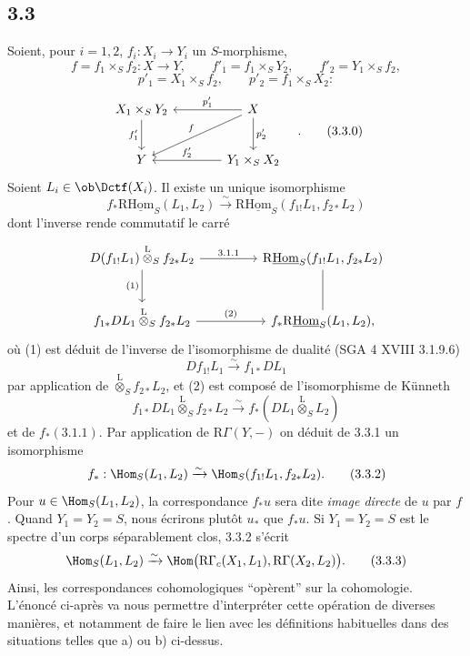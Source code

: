 \subsection*{3.3}
Soient, pour $i=1,2$, $f_i:X_i\to Y_i$ un $S$-morphisme,
\[
f=f_1\times_S f_2:X\to Y,
\qquad
f'_1=f_1\times_S Y_2,
\qquad
f'_2=Y_1\times_S f_2,
\]
\[
p'_1=X_1\times_S f_2,
\qquad
p'_2=f_1\times_S X_2:
\]
\begin{equation}
\begin{tikzcd}[column sep=3.8em,row sep=2.4em]
X_1\times_S Y_2 \arrow[d,"f'_1"'] & X \arrow[l,"p'_1"'] \arrow[dl,"f"'] \arrow[d,"p'_2"] \\
Y & Y_1\times_S X_2 \arrow[l,"f'_2"']
\end{tikzcd}\quad .
\tag{3.3.0}
\end{equation}
Soient $L_i\in\ob\Dctf(X_i)$. Il existe un unique isomorphisme
\begin{equation}
f_*\mathrm{R}\underline{\mathrm{Hom}}_S(L_1,L_2)
\xrightarrow{\sim}
\mathrm{R}\underline{\mathrm{Hom}}_S(f_{1!}L_1,f_{2*}L_2)
\tag{3.3.1}
\end{equation}
dont l'inverse rende commutatif le carré
\[
\begin{tikzcd}[column sep=4.5em,row sep=2.6em]
D(f_{1!}L_1)\overset{\mathrm{L}}{\otimes}_S f_{2*}L_2
  \arrow[r,"3.1.1"] \arrow[d,"(1)"']
& \mathrm{R}\underline{\mathrm{Hom}}_S(f_{1!}L_1,f_{2*}L_2) \arrow[d,dash] \\
f_{1*}DL_1\overset{\mathrm{L}}{\otimes}_S f_{2*}L_2
  \arrow[r,"(2)"]
& f_*\mathrm{R}\underline{\mathrm{Hom}}_S(L_1,L_2),
\end{tikzcd}
\]
où (1) est
déduit de l'inverse de l'isomorphisme de dualité (SGA 4 XVIII 3.1.9.6)
\[
Df_{1!}L_1\xrightarrow{\sim}f_{1*}DL_1
\]
par application de $\overset{\mathrm{L}}{\otimes}_S f_{2*}L_2$, et (2) est composé de l'isomorphisme de Künneth
\[
f_{1*}DL_1\overset{\mathrm{L}}{\otimes}_S f_{2*}L_2
\xrightarrow{\sim}
f_*(DL_1\overset{\mathrm{L}}{\otimes}_S L_2)
\]
et de $f_*(3.1.1)$. Par application de $\mathrm{R}\Gamma(Y,-)$ on déduit de 3.3.1 un isomorphisme
\begin{equation}
f_*:\Hom_S(L_1,L_2)
\xrightarrow{\sim}
\Hom_S(f_{1!}L_1,f_{2*}L_2).
\tag{3.3.2}
\end{equation}
Pour $u\in\Hom_S(L_1,L_2)$, la correspondance $f_*u$ sera dite \emph{image directe} de $u$ par $f$. Quand $Y_1=Y_2=S$, nous écrirons plutôt $u_*$ que $f_*u$. Si $Y_1=Y_2=S$ est le spectre d'un corps séparablement clos, 3.3.2 s'écrit
\begin{equation}
\Hom_S(L_1,L_2)
\xrightarrow{\sim}
\Hom\bigl(\mathrm{R}\Gamma_c(X_1,L_1),\mathrm{R}\Gamma(X_2,L_2)\bigr).
\tag{3.3.3}
\end{equation}
Ainsi, les correspondances cohomologiques ``opèrent'' sur la cohomologie. L'énoncé ci-après va nous permettre d'interpréter cette opération de diverses manières, et notamment de faire le lien avec les définitions habituelles dans des situations telles que a) ou b) ci-dessus.

